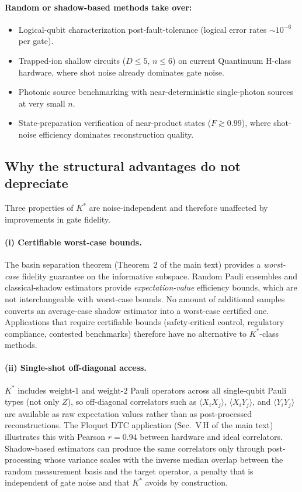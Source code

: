 \documentclass[twocolumn,prx,aps,superscriptaddress,longbibliography]{revtex4-2}
\begin{document}
\paragraph*{Random or shadow-based methods take over:}
\begin{itemize}
\item Logical-qubit characterization post-fault-tolerance
  (logical error rates $\sim 10^{-6}$ per gate).
\item Trapped-ion shallow circuits ($D \le 5$, $n \le 6$) on
  current Quantinuum H-class hardware, where shot noise already
  dominates gate noise.
\item Photonic source benchmarking with near-deterministic
  single-photon sources at very small $n$.
\item State-preparation verification of near-product states
  ($F \gtrsim 0.99$), where shot-noise efficiency dominates
  reconstruction quality.
\end{itemize}

\subsection{Why the structural advantages do not depreciate}
\label{sm:longevity-structural}

Three properties of $K^*$ are noise-independent and therefore
unaffected by improvements in gate fidelity.

\paragraph*{(i) Certifiable worst-case bounds.}
The basin separation theorem (Theorem~2 of the main text) provides
a \emph{worst-case} fidelity guarantee on the informative
subspace.  Random Pauli ensembles and classical-shadow estimators
provide \emph{expectation-value} efficiency bounds, which are not
interchangeable with worst-case bounds.  No amount of additional
samples converts an average-case shadow estimator into a worst-case
certified one.  Applications that require certifiable bounds
(safety-critical control, regulatory compliance, contested
benchmarks) therefore have no alternative to $K^*$-class methods.

\paragraph*{(ii) Single-shot off-diagonal access.}
$K^*$ includes weight-$1$ and weight-$2$ Pauli operators across
all single-qubit Pauli types (not only $Z$), so off-diagonal
correlators such as
$\langle X_i X_j \rangle$, $\langle X_i Y_j \rangle$, and
$\langle Y_i Y_j \rangle$ are available as raw expectation values
rather than as post-processed reconstructions.
The Floquet DTC application (Sec.~V\,H of the main text)
illustrates this with Pearson $r = 0.94$ between hardware and
ideal correlators.
Shadow-based estimators can produce the same correlators only
through post-processing whose variance scales with the inverse
median overlap between the random measurement basis and the target
operator, a penalty that is independent of gate noise and that
$K^*$ avoids by construction.
\end{document}
